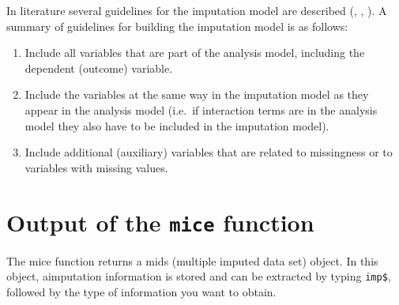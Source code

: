 \documentclass[]{book}
\newenvironment{Shaded}{\begin{snugshade}}{\end{snugshade}}
\newcommand{\KeywordTok}[1]{\textcolor[rgb]{0.13,0.29,0.53}{\textbf{#1}}}
\newcommand{\DataTypeTok}[1]{\textcolor[rgb]{0.13,0.29,0.53}{#1}}
\newcommand{\DecValTok}[1]{\textcolor[rgb]{0.00,0.00,0.81}{#1}}
\newcommand{\StringTok}[1]{\textcolor[rgb]{0.31,0.60,0.02}{#1}}
\newcommand{\OperatorTok}[1]{\textcolor[rgb]{0.81,0.36,0.00}{\textbf{#1}}}
\newcommand{\NormalTok}[1]{#1}
\providecommand{\tightlist}{%
  \setlength{\itemsep}{0pt}\setlength{\parskip}{0pt}}
\begin{document}
\begin{Shaded}
\end{Shaded}

In literature several guidelines for the imputation model are described
(\citet{COLLINS2001}, \citet{VanBuuren2018}, \citet{Rubin1976}). A
summary of guidelines for building the imputation model is as follows:

\begin{enumerate}
\def\labelenumi{\arabic{enumi}.}
\tightlist
\item
  Include all variables that are part of the analysis model, including
  the dependent (outcome) variable.
\item
  Include the variables at the same way in the imputation model as they
  appear in the analysis model (i.e.~if interaction terms are in the
  analysis model they also have to be included in the imputation model).
\item
  Include additional (auxiliary) variables that are related to
  missingness or to variables with missing values.
\end{enumerate}

\section{\texorpdfstring{Output of the \texttt{mice}
function}{Output of the mice function}}\label{output-of-the-mice-function}

The mice function returns a mids (multiple imputed data set) object. In
this object, aimputation information is stored and can be extracted by
typing \texttt{imp\$}, followed by the type of information you want to
obtain.

\begin{Shaded}
\end{Shaded}
\end{document}
